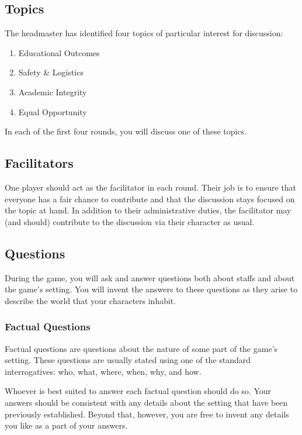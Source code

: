 \documentclass[a6paper, 11pt, parskip=half, DIV=15]{scrartcl}
\begin{document}
\newpage
\enlargethispage{3.5\baselineskip}

\subsection*{Topics}
The headmaster has identified four topics of particular interest for discussion:
\begin{enumerate}[nosep]
	\item Educational Outcomes
	\item Safety \& Logistics
	\item Academic Integrity
	\item Equal Opportunity
\end{enumerate}
In each of the first four rounds, you will discuss one of these topics.

\subsection*{Facilitators}
One player should act as the facilitator in each round. Their job is to ensure that everyone has a fair chance to contribute and that the discussion stays focused on the topic at hand. In addition to their administrative duties, the facilitator may (and should) contribute to the discussion via their character as usual. 

\newpage
\enlargethispage{3.5\baselineskip}

\subsection*{Questions}
During the game, you will ask and answer questions both about staffs and about the game's setting.
You will invent the answers to these questions as they arise to describe the world that your characters inhabit.

\subsubsection*{Factual Questions}

Factual questions are questions about the nature of some part of the game's setting.
These questions are usually stated using one of the standard interrogatives: who, what, where, when, why, and how.

Whoever is best suited to answer each factual question should do so.
Your answers should be consistent with any details about the setting that have been previously established.
Beyond that, however, you are free to invent any details you like as a part of your answers.
\end{document}
